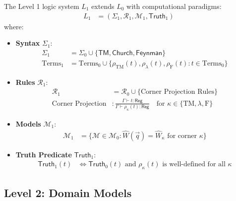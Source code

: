 \begin{definition}
The Level 1 logic system $L_1$ extends $L_0$ with computational paradigms:
\begin{align}
L_1 &= (\Sigma_1, \mathcal{R}_1, \mathcal{M}_1, \mathsf{Truth}_1)
\end{align}
where:
\begin{itemize}
\item \textbf{Syntax} $\Sigma_1$:
  \begin{align}
  \Sigma_1 &= \Sigma_0 \cup \{\mathsf{TM}, \mathsf{Church}, \mathsf{Feynman}\}\\
  \text{Terms}_1 &= \text{Terms}_0 \cup \{\rho_{\mathrm{TM}}(t), \rho_{\lambda}(t), \rho_{\mathrm{F}}(t) : t \in \text{Terms}_0\}
  \end{align}
\item \textbf{Rules} $\mathcal{R}_1$:
  \begin{align}
  \mathcal{R}_1 &= \mathcal{R}_0 \cup \{\text{Corner Projection Rules}\}\\
  \text{Corner Projection} &: \frac{\Gamma \vdash t : \mathsf{Reg}}{\Gamma \vdash \rho_\kappa(t) : \mathsf{Reg}} \quad \text{for } \kappa \in \{\mathrm{TM}, \lambda, \mathrm{F}\}
  \end{align}
\item \textbf{Models} $\mathcal{M}_1$:
  \begin{align}
  \mathcal{M}_1 &= \{\mathcal{M} \in \mathcal{M}_0 : \hat{W}(\vec{q}) = \hat{W}_\kappa \text{ for corner } \kappa\}
  \end{align}
\item \textbf{Truth Predicate} $\mathsf{Truth}_1$:
  \begin{align}
  \mathsf{Truth}_1(t) &\Leftrightarrow \mathsf{Truth}_0(t) \text{ and } \rho_\kappa(t) \text{ is well-defined for all } \kappa
  \end{align}
\end{itemize}
\end{definition}

\subsection{Level 2: Domain Models}

